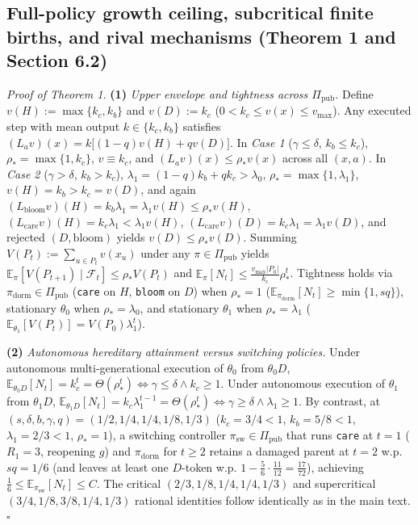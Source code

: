 \documentclass[12pt,letterpaper]{article}
\begin{document}
\subsection{Full-policy growth ceiling, subcritical finite births, and
rival mechanisms (Theorem 1 and Section
6.2)}\label{full-policy-growth-ceiling-subcritical-finite-births-and-rival-mechanisms-theorem-1-and-section-6.2}

\emph{Proof of Theorem 1.} \textbf{(1)} \emph{Upper envelope and
tightness across \(\Pi_{\mathrm{pub}}\).} Define
\(v(H) := \max\{k_c, k_b\}\) and \(v(D) := k_c\)
(\(0 < k_c \le v(x) \le v_{\max}\)). Any executed step with mean output
\(k \in \{k_c, k_b\}\) satisfies
\((L_a v)(x) = k\bigl[(1-q)v(H) + q v(D)\bigr]\). In \emph{Case 1}
(\(\gamma \le \delta\), \(k_b \le k_c\)), \(\rho_* = \max\{1, k_c\}\),
\(v \equiv k_c\), and \((L_a v)(x) \le \rho_* v(x)\) across all
\((x,a)\). In \emph{Case 2} (\(\gamma > \delta\), \(k_b > k_c\)),
\(\lambda_1 = (1-q)k_b + q k_c > \lambda_0\),
\(\rho_* = \max\{1, \lambda_1\}\), \(v(H) = k_b > k_c = v(D)\), and
again
\((L_{\mathrm{bloom}}v)(H) = k_b\lambda_1 = \lambda_1 v(H) \le \rho_* v(H)\),
\((L_{\mathrm{care}}v)(H) = k_c\lambda_1 < \lambda_1 v(H)\),
\((L_{\mathrm{care}}v)(D) = k_c\lambda_1 = \lambda_1 v(D)\), and
rejected \((D,\mathrm{bloom})\) yields \(v(D) \le \rho_* v(D)\). Summing
\(V(P_t) := \sum_{u\in P_t} v(x_u)\) under any
\(\pi \in \Pi_{\mathrm{pub}}\) yields
\(\mathbb{E}_\pi[V(P_{t+1}) \mid \mathcal{F}_t] \le \rho_* V(P_t)\) and
\(\mathbb{E}_\pi[N_t] \le \frac{v_{\max}|P_0|}{k_c}\rho_*^t\). Tightness
holds via \(\pi_{\mathrm{dorm}} \in \Pi_{\mathrm{pub}}\) (\texttt{care}
on \(H\), \texttt{bloom} on \(D\)) when \(\rho_* = 1\)
(\(\mathbb{E}_{\pi_{\mathrm{dorm}}}[N_t] \ge \min\{1, sq\}\)),
stationary \(\theta_0\) when \(\rho_* = \lambda_0\), and stationary
\(\theta_1\) when \(\rho_* = \lambda_1\)
(\(\mathbb{E}_{\theta_1}[V(P_t)] = V(P_0)\lambda_1^t\)).

\textbf{(2)} \emph{Autonomous hereditary attainment versus switching
policies.} Under autonomous multi-generational execution of \(\theta_0\)
from \(\theta_0 D\),
\(\mathbb{E}_{\theta_0 D}[N_t] = k_c^t = \Theta(\rho_*^t) \iff \gamma \le \delta \land k_c \ge 1\).
Under autonomous execution of \(\theta_1\) from \(\theta_1 D\),
\(\mathbb{E}_{\theta_1 D}[N_t] = k_c \lambda_1^{t-1} = \Theta(\rho_*^t) \iff \gamma \ge \delta \land \lambda_1 \ge 1\).
By contrast, at \((s,\delta,b,\gamma,q) = (1/2, 1/4, 1/4, 1/8, 1/3)\)
(\(k_c = 3/4 < 1\), \(k_b = 5/8 < 1\), \(\lambda_1 = 2/3 < 1\),
\(\rho_* = 1\)), a switching controller
\(\pi_{\mathrm{sw}} \in \Pi_{\mathrm{pub}}\) that runs \texttt{care} at
\(t=1\) (\(R_1 = 3\), reopening \(g\)) and \(\pi_{\mathrm{dorm}}\) for
\(t \ge 2\) retains a damaged parent at \(t=2\) w.p. \(sq = 1/6\) (and
leaves at least one \(D\)-token w.p.
\(1 - \frac{5}{6}\cdot\frac{11}{12} = \frac{17}{72}\)), achieving
\(\frac{1}{6} \le \mathbb{E}_{\pi_{\mathrm{sw}}}[N_t] \le C\). The
critical \((2/3,1/8,1/4,1/4,1/3)\) and supercritical
\((3/4,1/8,3/8,1/4,1/3)\) rational identities follow identically as in
the main text. \(\square\)
\end{document}
